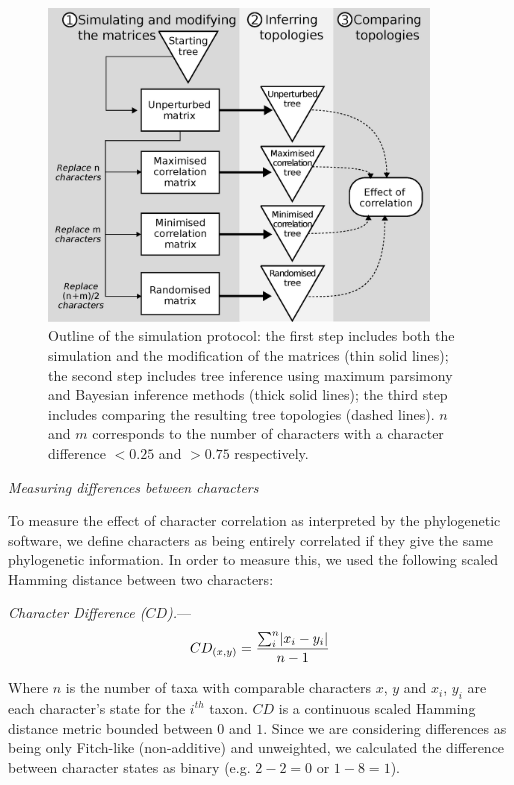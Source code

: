 \documentclass[12pt,letterpaper]{article}
\DeclarePairedDelimiter\abs{\lvert}{\rvert}%
\renewcommand{\subsection}[1]{%
\bigskip
\begin{center}
\begin{large}
\normalfont\itshape #1
\end{large}
\end{center}}
\renewcommand{\subsubsection}[1]{%
\vspace{2ex}
\noindent
\textit{#1.}---}
\begin{document}
\begin{figure}[!htbp]
\centering
   \includegraphics[width=0.9\textwidth]{outline.eps}
\caption{Outline of the simulation protocol: the first step includes both the simulation and the modification of the matrices (thin solid lines); the second step includes tree inference using maximum parsimony and Bayesian inference methods (thick solid lines); the third step includes comparing the resulting tree topologies (dashed lines). $n$ and $m$ corresponds to the number of characters with a character difference $<0.25$ and $>0.75$ respectively.}
\label{Fig:outline}
\end{figure}

\subsection{Measuring differences between characters}
\label{CDdescription}
To measure the effect of character correlation as interpreted by the phylogenetic software, we define characters as being entirely correlated if they give the same phylogenetic information.
In order to measure this, we used the following scaled Hamming distance between two characters:

\subsubsection{Character Difference ($CD$)}
\begin{equation}
    CD_{(x,y)} = \frac{\sum_{i}^{n}\abs{x_{i} - y_{i}}}{n-1}
\end{equation}

\noindent Where $n$ is the number of taxa with comparable characters $x$, $y$ and $x_i$, $y_i$ are each character's state for the $i^{th}$ taxon.
$CD$ is a continuous scaled Hamming distance metric bounded between $0$ and $1$.
Since we are considering differences as being only Fitch-like (non-additive) and unweighted, we calculated the difference between character states as binary (e.g. $2 - 2 = 0$ or $1 - 8 = 1$).
\end{document}
